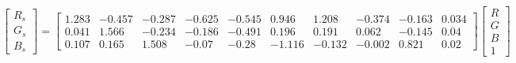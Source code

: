 \begin{equation}
\begin{bmatrix}
  R_s \\ G_s \\ B_s 
\end{bmatrix}=
\left[\begin{matrix}1.283 & -0.457 & -0.287 & -0.625 & -0.545 & 0.946 & 1.208 & -0.374 & -0.163 & 0.034\\ 
0.041 & 1.566 & -0.234 & -0.186 & -0.491 & 0.196 & 0.191 & 0.062 & -0.145 & 0.04\\ 
0.107 & 0.165 & 1.508 & -0.07 & -0.28 & -1.116 & -0.132 & -0.002 & 0.821 & 0.02\end{matrix}\right]
\begin{bmatrix}
  R \\ G \\ B \\ 1 
\end{bmatrix}
\end{equation}
